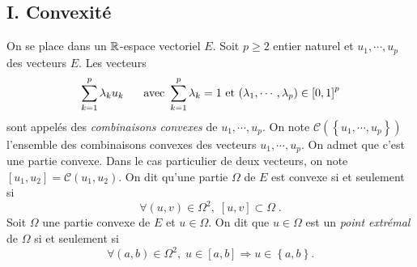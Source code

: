 \subsection*{I. Convexité} \noindent
On se place dans un $\mathbb{R}$-espace vectoriel $E$.\newline
Soit $p \geq 2$ entier naturel et $u_1, \cdots, u_p$ des vecteurs $E$. Les vecteurs
\[
 \sum_{k=1}^p \lambda_k u_k \hspace{0.5cm} \text{ avec } \sum_{k=1}^p \lambda_k  = 1 \text{ et } (\lambda_1, \cdots, \lambda_p) \in \left[ 0,1\right]^{p}  
\]
sont appelés des \emph{combinaisons convexes} de $u_1, \cdots ,u_p$.\newline
On note $\mathcal{C}(\left\lbrace u_1,\cdots,u_p\right\rbrace )$ l'ensemble des combinaisons convexes des vecteurs $u_1, \cdots, u_p$. On admet que c'est une partie convexe.\newline
Dans le cas particulier de deux vecteurs, on note $\left[ u_1,u_2 \right] = \mathcal{C}(u_1,u_2)$.\newline
On dit qu'une partie $\Omega$ de $E$ est convexe si et seulement si
\[
 \forall (u,v) \in \Omega^2, \; \left[ u,v\right] \subset \Omega \;. 
\]
Soit $\Omega$ une partie convexe de $E$ et $u\in \Omega$. On dit que $u \in \Omega$ est un \emph{point extrémal} de $\Omega$ si et seulement si
\[
 \forall (a,b)\in \Omega^2, \; u \in \left[ a,b \right] \Rightarrow u \in \left\lbrace a,b\right\rbrace .
\]
